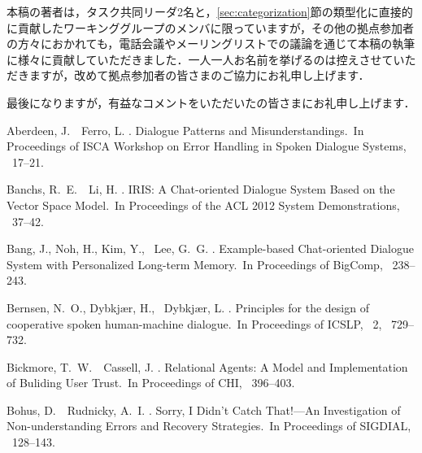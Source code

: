 \documentclass[japanese]{jnlp_1.4}
\renewcommand{\mod}[1]{}
\begin{document}
本稿の著者は，タスク共同リーダ2名と，\ref{sec:categorization}節の類型化に直接的に貢献したワーキンググループのメンバに限っていますが，その他の拠点参加者の方々におかれても，電話会議やメーリングリストでの議論を通じて本稿の執筆に様々に貢献していただきました．一人一人お名前を挙げるのは控えさせていただきますが，改めて拠点参加者の皆さまのご協力にお礼申し上げます．

最後になりますが，有益なコメントをいただいた\mod{編集委員・査読者}の皆さまにお礼申し上げます．


\begin{thebibliography}{}

Aberdeen, J.\BBACOMMA\ \BBA\ Ferro, L. \BBCP.
\newblock \BBOQ Dialogue Patterns and Misunderstandings.\BBCQ\
\newblock In {\Bem Proceedings of ISCA Workshop on Error Handling in Spoken
  Dialogue Systems}, \mbox{\BPGS\ 17--21}.

Banchs, R.~E.\BBACOMMA\ \BBA\ Li, H. \BBCP.
\newblock \BBOQ IRIS: A Chat-oriented Dialogue System Based on the Vector Space
  Model.\BBCQ\
\newblock In {\Bem Proceedings of the ACL 2012 System Demonstrations},
  \mbox{\BPGS\ 37--42}.

Bang, J., Noh, H., Kim, Y., \BBA\ Lee, G.~G. \BBCP.
\newblock \BBOQ Example-based Chat-oriented Dialogue System with Personalized
  Long-term Memory.\BBCQ\
\newblock In {\Bem Proceedings of BigComp}, \mbox{\BPGS\ 238--243}.

Bernsen, N.~O., Dybkj{\ae}r, H., \BBA\ Dybkj{\ae}r, L. \BBOP 1996\BBCP.
\newblock \BBOQ Principles for the design of cooperative spoken human-machine
  dialogue.\BBCQ\
\newblock In {\Bem Proceedings of ICSLP}, \lowercase{\BVOL}~2, \mbox{\BPGS\
  729--732}.

Bickmore, T.~W.\BBACOMMA\ \BBA\ Cassell, J. \BBOP 2001\BBCP.
\newblock \BBOQ Relational Agents: A Model and Implementation of Buliding User
  Trust.\BBCQ\
\newblock In {\Bem Proceedings of CHI}, \mbox{\BPGS\ 396--403}.

Bohus, D.\BBACOMMA\ \BBA\ Rudnicky, A.~I. \BBOP 2005\BBCP.
\newblock \BBOQ Sorry, I Didn't Catch That!---An Investigation of
  Non-understanding Errors and Recovery Strategies.\BBCQ\
\newblock In {\Bem Proceedings of SIGDIAL}, \mbox{\BPGS\ 128--143}.


\end{thebibliography}
\end{document}
